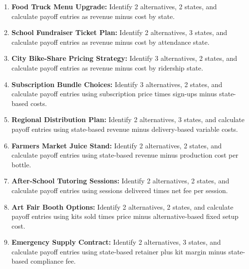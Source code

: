 	\begin{enumerate}
		\item \textbf{Food Truck Menu Upgrade:} Identify 2 alternatives, 2 states, and calculate payoff entries as revenue minus cost by state.
		\item \textbf{School Fundraiser Ticket Plan:} Identify 2 alternatives, 3 states, and calculate payoff entries as revenue minus cost by attendance state.
		\item \textbf{City Bike-Share Pricing Strategy:} Identify 3 alternatives, 2 states, and calculate payoff entries as revenue minus cost by ridership state.
		\item \textbf{Subscription Bundle Choices:} Identify 3 alternatives, 2 states, and calculate payoff entries using subscription price times sign-ups minus state-based costs.
		\item \textbf{Regional Distribution Plan:} Identify 2 alternatives, 3 states, and calculate payoff entries using state-based revenue minus delivery-based variable costs.
		\item \textbf{Farmers Market Juice Stand:} Identify 2 alternatives, 2 states, and calculate payoff entries using state-based revenue minus production cost per bottle.
		\item \textbf{After-School Tutoring Sessions:} Identify 2 alternatives, 2 states, and calculate payoff entries using sessions delivered times net fee per session.
		\item \textbf{Art Fair Booth Options:} Identify 2 alternatives, 2 states, and calculate payoff entries using kits sold times price minus alternative-based fixed setup cost.
		\item \textbf{Emergency Supply Contract:} Identify 2 alternatives, 3 states, and calculate payoff entries using state-based retainer plus kit margin minus state-based compliance fee.
	\end{enumerate}


